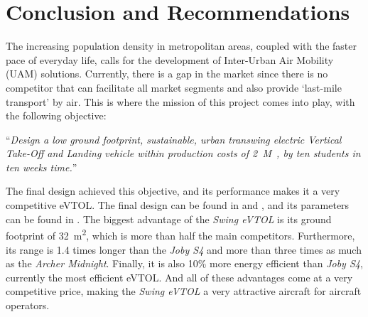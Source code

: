 \chapter{Conclusion and Recommendations}
\label{ch:Conclusion}
The increasing population density in metropolitan areas,
coupled with the faster pace of everyday life, calls for the development of Inter-Urban Air Mobility (UAM) solutions.
Currently,
there is a gap in the market
since there is no competitor that can facilitate all market segments
and also provide \enquote*{last-mile transport} by air.
This is where the mission of this project comes into play, with the following objective:

“\textit{Design a low ground footprint, sustainable, urban transwing electric Vertical Take-Off and Landing vehicle within production costs of \qty{2}{M \texteuro}, by ten students in ten weeks time.}”

The final design achieved this objective, and its performance makes it a very competitive eVTOL.
The final design can be found in  and ,
and its parameters can be found in .
The biggest advantage of the \textit{Swing eVTOL} is its ground footprint of \qty{32}{m^2},
which is more than half the main competitors.
Furthermore,
its range is 1.4 times longer than the \textit{Joby S4} and more than three times as much as the \textit{Archer Midnight}.
Finally, it is also 10\% more energy efficient than \textit{Joby S4}, currently the most efficient eVTOL.
And all of these advantages come at a very competitive price,
making the \textit{Swing eVTOL} a very attractive aircraft for aircraft operators.

